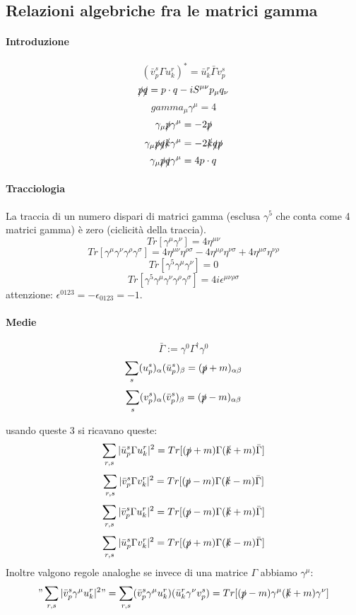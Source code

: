 \documentclass[12pt,a4paper]{article}
\begin{document}
	\subsection{Relazioni algebriche fra le matrici gamma}
	\paragraph{Introduzione}
	\[ (\bar{v}^s_p \Gamma u^r_k)^* = \bar{u}^r_k \bar{\Gamma} v^s_p \]
	\[ \slashed{p}\slashed{q} = p\cdot q - i S^{\mu\nu} p_\mu q_\nu \]
	\[ gamma_\mu \gamma^\mu = 4 \]
	\[ \gamma_\mu \slashed{p}\gamma^\mu = -2 \slashed{p} \]
	\[ \gamma_\mu\slashed{p}\slashed{q}\slashed{k}\gamma^\mu = -2 \slashed{k}\slashed{q}\slashed{p} \]
	\[ \gamma_\mu \slashed{p}\slashed{q}\gamma^\mu = 4 p\cdot q \]
	
	\paragraph{Tracciologia}
	La traccia di un numero dispari di matrici gamma (esclusa $\gamma^5$ che conta come 4 matrici gamma) è zero (ciclicità della traccia).
	\[ Tr[\gamma^\mu\gamma^\nu] = 4\eta^{\mu\nu} \]
	\[ Tr[\gamma^\mu\gamma^\nu\gamma^\rho\gamma^\sigma] = 4\eta^{\mu\nu}\eta^{\rho\sigma} -4\eta^{\mu\rho}\eta^{\nu\sigma} + 4\eta^{\mu\sigma}\eta^{\nu\rho} \]
	\[ Tr[\gamma^5\gamma^\mu\gamma^\nu] = 0 \]
	\[ Tr[\gamma^5\gamma^\mu\gamma^\nu\gamma^\rho\gamma^\sigma] = 4i\epsilon^{\mu\nu\rho\sigma} \]
	attenzione: $\epsilon^{0123} = -\epsilon_{0123} = -1$.
	
	\paragraph{Medie}
	\[ \bar{\Gamma} := \gamma^0 \Gamma^\dagger \gamma^0 \]
	\[ \sum_s (u^s_p)_\alpha (\bar{u}^s_p)_\beta = (\slashed{p}+m)_{\alpha\beta} \]
	\[ \sum_s (v^s_p)_\alpha (\bar{v}^s_p)_\beta = (\slashed{p}-m)_{\alpha\beta} \]
	
	usando queste 3 si ricavano queste:
	\[ \sum_{r,s}|\bar{u}^s_p \Gamma u^r_k|^2 = Tr[(\slashed{p}+m) \Gamma (\slashed{k}+m) \bar{\Gamma}] \]
	\[ \sum_{r,s}|\bar{v}^s_p \Gamma v^r_k|^2 = Tr[(\slashed{p}-m) \Gamma (\slashed{k}-m) \bar{\Gamma}] \]
	\[ \sum_{r,s}|\bar{v}^s_p \Gamma u^r_k|^2 = Tr[(\slashed{p}-m) \Gamma (\slashed{k}+m) \bar{\Gamma}] \]
	\[ \sum_{r,s}|\bar{u}^s_p \Gamma v^r_k|^2 = Tr[(\slashed{p}+m) \Gamma (\slashed{k}-m) \bar{\Gamma}] \]
	Inoltre valgono regole analoghe se invece di una matrice $\Gamma$ abbiamo $\gamma^\mu$:
	\[ "\sum_{r,s}|\bar{v}^s_p \gamma^\mu u^r_k|^2" = \sum_{r,s}(\bar{v}^s_p \gamma^\mu u^r_k)(\bar{u}^r_k \gamma^\nu v^s_p) = Tr[(\slashed{p}-m) \gamma^\mu (\slashed{k}+m) \gamma^\nu] \]
	
\end{document}
